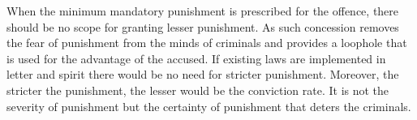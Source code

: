 \begin{multicols}{2}
\noi
When the minimum mandatory punishment is prescribed for the offence, there should
be no scope for granting lesser punishment. As such concession removes the fear of
punishment from the minds of criminals and provides a loophole that is used for the
advantage of the accused. If existing laws are implemented in letter and spirit there
would be no need for stricter punishment. Moreover, the stricter the punishment, the
lesser would be the conviction rate. It is not the severity of punishment but the certainty
of punishment that deters the criminals.

\end{multicols}




\label{end2016-art1}
